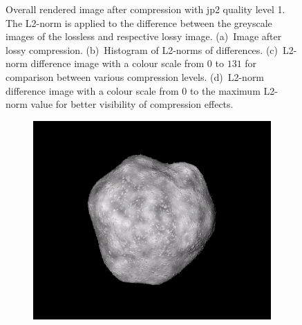 \begin{figure}[htb]
\begin{subfigure}[b]{0.48\textwidth}
        \caption{}
        \label{fig:img_quality_comp_jp2_1_diff_rel}
    \end{subfigure}
    \caption{Overall rendered image after compression with \gls{jp2} quality level 1. The L2-norm is applied to the difference between the greyscale images of the lossless and respective lossy image. (a)~Image after lossy compression. (b)~Histogram of L2-norms of differences. (c)~L2-norm difference image with a colour scale from $0$ to $131$ for comparison between various compression levels. (d)~L2-norm difference image with a colour scale from $0$ to the maximum L2-norm value for better visibility of compression effects.}
    \label{fig:img_quality_comp_jp2_1}
\end{figure}


\begin{figure}[htb]
    \centering
    \begin{subfigure}[b]{0.48\textwidth}
        \centering
        \includegraphics[width=\textwidth]{doc/thesis/0_figures/compare_quality/set1/jp2_5}
        \caption{}
        \label{fig:img_quality_comp_jp2_5_orig}
    \end{subfigure}
    \begin{subfigure}[b]{0.48\textwidth}
        \centering

\end{subfigure}
\end{figure}
